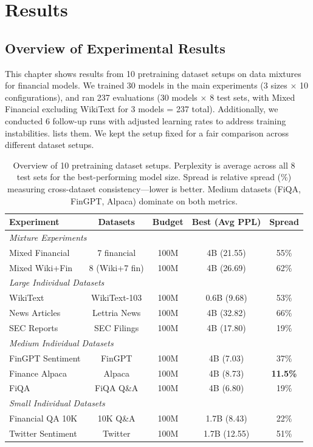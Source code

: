 \chapter{Results}

\section{Overview of Experimental Results}

This chapter shows results from 10 pretraining dataset setups on data mixtures for financial models. We trained 30 models in the main experiments (3 sizes $\times$ 10 configurations), and ran 237 evaluations (30 models $\times$ 8 test sets, with Mixed Financial excluding WikiText for 3 models = 237 total). Additionally, we conducted 6 follow-up runs with adjusted learning rates to address training instabilities.  lists them. We kept the setup fixed for a fair comparison across different dataset setups.

\begin{table}[htbp]
\centering
\small
\begin{tabular}{lcccc}
\toprule
\textbf{Experiment} & \textbf{Datasets} & \textbf{Budget} & \textbf{Best (Avg PPL)} & \textbf{Spread} \\
\midrule
\multicolumn{5}{l}{\textit{Mixture Experiments}} \\
Mixed Financial & 7 financial & 100M & 4B (21.55) & 55\% \\
Mixed Wiki+Fin & 8 (Wiki+7 fin) & 100M & 4B (26.69) & 62\% \\
\midrule
\multicolumn{5}{l}{\textit{Large Individual Datasets}} \\
WikiText & WikiText-103 & 100M & 0.6B (9.68) & 53\% \\
News Articles & Lettria News & 100M & 4B (32.82) & 66\% \\
SEC Reports & SEC Filings & 100M & 4B (17.80) & 19\% \\
\midrule
\multicolumn{5}{l}{\textit{Medium Individual Datasets}} \\
FinGPT Sentiment & FinGPT & 100M & 4B (7.03) & 37\% \\
Finance Alpaca & Alpaca & 100M & 4B (8.73) & \textbf{11.5\%} \\
FiQA & FiQA Q\&A & 100M & 4B (6.80) & 19\% \\
\midrule
\multicolumn{5}{l}{\textit{Small Individual Datasets}} \\
Financial QA 10K & 10K Q\&A & 100M & 1.7B (8.43) & 22\% \\
Twitter Sentiment & Twitter & 100M & 1.7B (12.55) & 51\% \\
\bottomrule
\end{tabular}
\caption[Overview of Pretraining Experiments]{Overview of 10 pretraining dataset setups. Perplexity is average across all 8 test sets for the best-performing model size. Spread is relative spread (\%) measuring cross-dataset consistency—lower is better. Medium datasets (FiQA, FinGPT, Alpaca) dominate on both metrics.}
\label{tab:experiments_overview}
\end{table}

